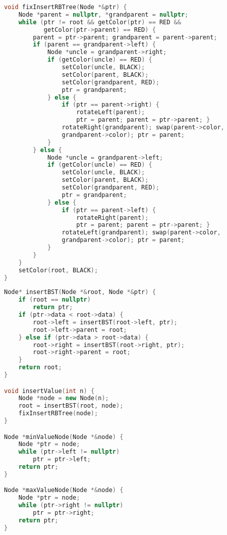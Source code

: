 \newpage

\begin{lstlisting}[language=C++, title=Parte III de IV: Inserção (Parte 1 de 2)]
void fixInsertRBTree(Node *&ptr) {
	Node *parent = nullptr, *grandparent = nullptr;
	while (ptr != root && getColor(ptr) == RED &&
	       getColor(ptr->parent) == RED) {
		parent = ptr->parent; grandparent = parent->parent;
		if (parent == grandparent->left) {
			Node *uncle = grandparent->right;
			if (getColor(uncle) == RED) {
				setColor(uncle, BLACK);
				setColor(parent, BLACK);
				setColor(grandparent, RED);
				ptr = grandparent;
			} else {
				if (ptr == parent->right) {
					rotateLeft(parent);
					ptr = parent; parent = ptr->parent; }
				rotateRight(grandparent); swap(parent->color, 
				grandparent->color); ptr = parent;
			}
		} else {
			Node *uncle = grandparent->left;
			if (getColor(uncle) == RED) {
				setColor(uncle, BLACK);
				setColor(parent, BLACK);
				setColor(grandparent, RED);
				ptr = grandparent;
			} else {
				if (ptr == parent->left) {
					rotateRight(parent);
					ptr = parent; parent = ptr->parent; }
				rotateLeft(grandparent); swap(parent->color,
				grandparent->color); ptr = parent;
			}
		}
	}
	setColor(root, BLACK);
}
\end{lstlisting}

\newpage

\begin{lstlisting}[language=C++, title=Parte III de IV: Inserção (Parte 2 de 2) e Min/Max ValueNode]
Node* insertBST(Node *&root, Node *&ptr) {
	if (root == nullptr)
		return ptr;
	if (ptr->data < root->data) {
		root->left = insertBST(root->left, ptr);
		root->left->parent = root;
	} else if (ptr->data > root->data) {
		root->right = insertBST(root->right, ptr);
		root->right->parent = root;
	}
	return root;
}

void insertValue(int n) {
	Node *node = new Node(n);
	root = insertBST(root, node);
	fixInsertRBTree(node);
}

Node *minValueNode(Node *&node) {
    Node *ptr = node;
    while (ptr->left != nullptr)
        ptr = ptr->left;
    return ptr;
}

Node *maxValueNode(Node *&node) {
    Node *ptr = node;
    while (ptr->right != nullptr)
        ptr = ptr->right;
    return ptr;
}
\end{lstlisting}

\newpage

